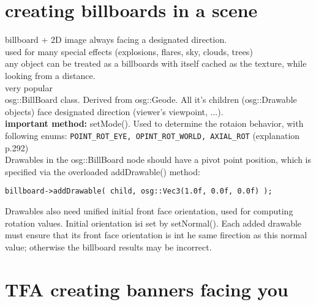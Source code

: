 \documentclass[a4paper,12pt]{book}
\begin{document}
\section{creating billboards in a scene}
billboard + 2D image always facing a designated direction.\\
used for many special effects (explosions, flares, sky, clouds, trees)\\
\textrightarrow any object can be treated as a billboards with itself cached as the texture, while looking from a distance.\\
\textrightarrow very popular\\
\textrightarrow osg::BillBoard class. Derived from osg::Geode. All it's children (osg::Drawable objects) face designated direction (viewer's viewpoint, ...).\\
\textbf{important method:} setMode(). Used to determine the rotaion behavior, with following enums: \verb|POINT_ROT_EYE, OPINT_ROT_WORLD, AXIAL_ROT| (explanation p.292)\\
Drawables in the osg::BillBoard node should have a pivot point position, which is specified via the overloaded addDrawable() method: 
\begin{lstlisting} 
billboard->addDrawable( child, osg::Vec3(1.0f, 0.0f, 0.0f) ); 
\end{lstlisting}
Drawables also need unified initial front face orientation, used for computing rotation values. Initial orientation isi set by setNormal(). Each added drawable must ensure that its front face orientation is int he same firection as this normal value; otherwise the billboard results may be incorrect.

\section{TFA creating banners facing you}
\end{document}
